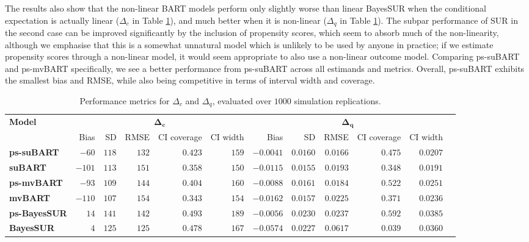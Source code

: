 \documentclass[aoas,preprint]{imsart}
\theoremstyle{plain}
\theoremstyle{definition}
\theoremstyle{remark}
\begin{document}
The results also show that the non-linear BART models perform only slightly worse than linear BayesSUR when the conditional expectation is actually linear ($\Delta_c$ in Table \ref{tab:results_Delta_cq}), and much better when it is non-linear ($\Delta_q$ in Table \ref{tab:results_Delta_cq}). The subpar performance of SUR in the second case can be improved significantly by the inclusion of propensity scores, which seem to absorb much of the non-linearity, although we emphasise that this is a somewhat unnatural model which is unlikely to be used by anyone in practice; if we estimate propensity scores through a non-linear model, it would seem appropriate to also use a non-linear outcome model. Comparing ps-suBART and ps-mvBART specifically, we see a better performance from ps-suBART across all estimands and metrics. Overall, ps-suBART exhibits the smallest bias and RMSE, while also being competitive in terms of interval width and coverage.
\begin{table}[H]
\caption{Performance metrics for $\Delta_c$ and $\Delta_q$, evaluated over $1000$ simulation replications. \label{tab:results_Delta_cq}}
\setlength{\tabcolsep}{2.76pt}
\begin{tabular}{lrrrrrrrrrrr}
\multirow{2}{*}{\textbf{Model}} &\multicolumn{5}{c}{$\mathbf{\Delta_c}$}&\multicolumn{5}{c}{$\mathbf{\Delta_q}$}\\
\cline{2-11}
 & Bias & SD & RMSE & CI coverage & CI width & Bias & SD & RMSE & CI coverage & CI width \\
\hline
\textbf{ps-suBART} & $-60$& $118$& $132$& $0.423$& $159$& $-0.0041$& $0.0160$& $0.0166$& $0.475$& $0.0207$ \\
\textbf{suBART} & $-101$& $113$& $151$& $0.358$& $150$& $-0.0115$& $0.0155$& $0.0193$& $0.348$& $0.0191$\\
\textbf{ps-mvBART} & $-93$& $109$& $144$& $0.404$& $160$& $-0.0088$& $0.0161$& $0.0184$& $0.522$& $0.0251$\\
\textbf{mvBART} & $-110$& $107$& $154$& $0.343$& $154$& $-0.0162$& $0.0157$& $0.0225$& $0.371$& $0.0236$\\
\textbf{ps-BayesSUR} & $14$& $141$& $142$& $0.493$& $189$& $-0.0056$& $0.0230$& $0.0237$& $0.592$& $0.0385$\\
\textbf{BayesSUR} & $4$& $125$& $125$& $0.478$& $167$& $-0.0574$& $0.0227$& $0.0617$& $0.039$& $0.0360$
\end{tabular}
\end{table}
\vspace{-2em}
\end{document}
